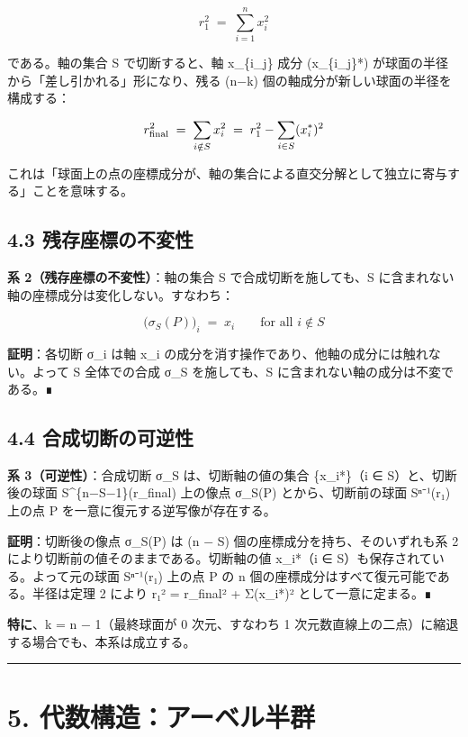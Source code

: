 \documentclass[a4paper,11pt]{ltjsarticle}
\theoremstyle{definition}
\theoremstyle{remark}
\begin{document}
\[
r_1^{2} \;=\; \sum_{i=1}^{n} x_i^{2}
\]

である。軸の集合 S で切断すると、軸 x\_\{i\_j\} 成分 (x\_\{i\_j\}*)
が球面の半径から「差し引かれる」形になり、残る (n−k)
個の軸成分が新しい球面の半径を構成する：

\[
r_{\rm final}^{2} \;=\; \sum_{i \notin S} x_i^{2} \;=\; r_1^{2} - \sum_{i \in S} (x_i^{*})^{2}
\]

これは「球面上の点の座標成分が、軸の集合による直交分解として独立に寄与する」ことを意味する。

\subsection{4.3
残存座標の不変性}\label{ux6b8bux5b58ux5ea7ux6a19ux306eux4e0dux5909ux6027}

\textbf{系 2（残存座標の不変性）}：軸の集合 S で合成切断を施しても、S
に含まれない軸の座標成分は変化しない。すなわち：

\[
\bigl(\sigma_S(P)\bigr)_i \;=\; x_i \qquad \text{for all } i \notin S
\]

\textbf{証明}：各切断 σ\_i は軸 x\_i
の成分を消す操作であり、他軸の成分には触れない。よって S 全体での合成
σ\_S を施しても、S に含まれない軸の成分は不変である。∎

\subsection{4.4
合成切断の可逆性}\label{ux5408ux6210ux5207ux65adux306eux53efux9006ux6027}

\textbf{系 3（可逆性）}：合成切断 σ\_S は、切断軸の値の集合 \{x\_i*\}（i
∈ S）と、切断後の球面 S\^{}\{n−\textbar S\textbar−1\}(r\_final) 上の像点
σ\_S(P) とから、切断前の球面 Sⁿ⁻¹(r₁) 上の点 P
を一意に復元する逆写像が存在する。

\textbf{証明}：切断後の像点 σ\_S(P) は (n − \textbar S\textbar)
個の座標成分を持ち、そのいずれも系 2
により切断前の値そのままである。切断軸の値 x\_i*（i ∈
S）も保存されている。よって元の球面 Sⁿ⁻¹(r₁) 上の点 P の n
個の座標成分はすべて復元可能である。半径は定理 2 により r₁² = r\_final²
+ Σ(x\_i*)² として一意に定まる。∎

\textbf{特に}、k = n − 1（最終球面が 0 次元、すなわち 1
次元数直線上の二点）に縮退する場合でも、本系は成立する。

\begin{center}\rule{0.5\linewidth}{0.5pt}\end{center}

\section{5.
代数構造：アーベル半群}\label{ux4ee3ux6570ux69cbux9020ux30a2ux30fcux30d9ux30ebux534aux7fa4}
\end{document}
